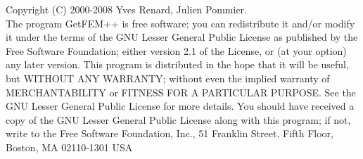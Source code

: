 Copyright (C) 2000-2008 Yves Renard, Julien Pommier.\\
The program GetFEM++ is free software; you can redistribute it and/or modify
it under the terms of the GNU Lesser General Public License as published by
the Free Software Foundation; either version 2.1 of the License, or
(at your option) any later version.
This program is distributed in the hope that it will be useful,
but WITHOUT ANY WARRANTY; without even the implied warranty of
MERCHANTABILITY or FITNESS FOR A PARTICULAR PURPOSE.  See the
GNU Lesser General Public License for more details.
You should have received a copy of the GNU  Lesser General Public License
along with this program; if not, write to the Free Software Foundation,
Inc., 51 Franklin Street, Fifth Floor, Boston, MA  02110-1301  USA
